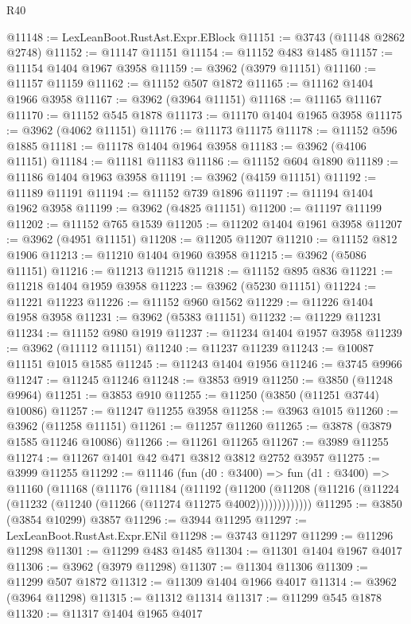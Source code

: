 \begin{lexlean}{R40}
\begin{coremodule}
@11148 := LexLeanBoot.RustAst.Expr.EBlock
@11151 := @3743 (@11148 @2862 @2748)
@11152 := @11147 @11151
@11154 := @11152 @483 @1485
@11157 := @11154 @1404 @1967 @3958
@11159 := @3962 (@3979 @11151)
@11160 := @11157 @11159
@11162 := @11152 @507 @1872
@11165 := @11162 @1404 @1966 @3958
@11167 := @3962 (@3964 @11151)
@11168 := @11165 @11167
@11170 := @11152 @545 @1878
@11173 := @11170 @1404 @1965 @3958
@11175 := @3962 (@4062 @11151)
@11176 := @11173 @11175
@11178 := @11152 @596 @1885
@11181 := @11178 @1404 @1964 @3958
@11183 := @3962 (@4106 @11151)
@11184 := @11181 @11183
@11186 := @11152 @604 @1890
@11189 := @11186 @1404 @1963 @3958
@11191 := @3962 (@4159 @11151)
@11192 := @11189 @11191
@11194 := @11152 @739 @1896
@11197 := @11194 @1404 @1962 @3958
@11199 := @3962 (@4825 @11151)
@11200 := @11197 @11199
@11202 := @11152 @765 @1539
@11205 := @11202 @1404 @1961 @3958
@11207 := @3962 (@4951 @11151)
@11208 := @11205 @11207
@11210 := @11152 @812 @1906
@11213 := @11210 @1404 @1960 @3958
@11215 := @3962 (@5086 @11151)
@11216 := @11213 @11215
@11218 := @11152 @895 @836
@11221 := @11218 @1404 @1959 @3958
@11223 := @3962 (@5230 @11151)
@11224 := @11221 @11223
@11226 := @11152 @960 @1562
@11229 := @11226 @1404 @1958 @3958
@11231 := @3962 (@5383 @11151)
@11232 := @11229 @11231
@11234 := @11152 @980 @1919
@11237 := @11234 @1404 @1957 @3958
@11239 := @3962 (@11112 @11151)
@11240 := @11237 @11239
@11243 := @10087 @11151 @1015 @1585
@11245 := @11243 @1404 @1956
@11246 := @3745 @9966
@11247 := @11245 @11246
@11248 := @3853 @919
@11250 := @3850 (@11248 @9964)
@11251 := @3853 @910
@11255 := @11250 (@3850 (@11251 @3744) @10086)
@11257 := @11247 @11255 @3958
@11258 := @3963 @1015
@11260 := @3962 (@11258 @11151)
@11261 := @11257 @11260
@11265 := @3878 (@3879 @1585 @11246 @10086)
@11266 := @11261 @11265
@11267 := @3989 @11255
@11274 := @11267 @1401 @42 @471 @3812 @3812 @2752 @3957
@11275 := @3999 @11255
@11292 := @11146
    (fun (d0 : @3400) =>
    fun (d1 : @3400) =>
    @11160
      (@11168
        (@11176
          (@11184
            (@11192
              (@11200
                (@11208 (@11216 (@11224 (@11232 (@11240 (@11266 (@11274 @11275 @4002)))))))))))))
@11295 := @3850 (@3854 @10299) @3857
@11296 := @3944 @11295
@11297 := LexLeanBoot.RustAst.Expr.ENil
@11298 := @3743 @11297
@11299 := @11296 @11298
@11301 := @11299 @483 @1485
@11304 := @11301 @1404 @1967 @4017
@11306 := @3962 (@3979 @11298)
@11307 := @11304 @11306
@11309 := @11299 @507 @1872
@11312 := @11309 @1404 @1966 @4017
@11314 := @3962 (@3964 @11298)
@11315 := @11312 @11314
@11317 := @11299 @545 @1878
@11320 := @11317 @1404 @1965 @4017

\end{coremodule}
\end{lexlean}
